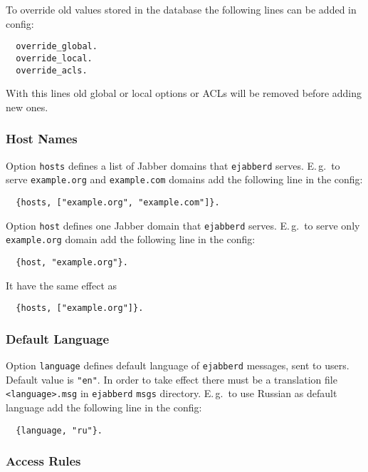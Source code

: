 \documentclass[a4paper,10pt]{article}
\newcommand{\jid}[1]{\texttt{#1}}
\newcommand{\option}[1]{\texttt{#1}}
\newcommand{\term}[1]{\texttt{#1}}
\newcommand{\ejabberd}{\texttt{ejabberd}}
\newcommand{\Jabber}{Jabber}
\begin{document}
To override old values stored in the database the following lines can be added
in config:
\begin{verbatim}
  override_global.
  override_local.
  override_acls.
\end{verbatim}
With this lines old global or local options or ACLs will be removed before
adding new ones.


\subsubsection{Host Names}
\label{sec:confighostname}

Option \option{hosts} defines a list of \Jabber{} domains that \ejabberd{}
serves.  E.\,g.\ to serve \jid{example.org} and \jid{example.com} domains add
the following line in the config:
\begin{verbatim}
  {hosts, ["example.org", "example.com"]}.
\end{verbatim}

Option \option{host} defines one \Jabber{} domain that \ejabberd{} serves.
E.\,g.\ to serve only \jid{example.org} domain add the following line in the
config:
\begin{verbatim}
  {host, "example.org"}.
\end{verbatim}
It have the same effect as
\begin{verbatim}
  {hosts, ["example.org"]}.
\end{verbatim}


\subsubsection{Default Language}
\label{sec:configlanguage}

Option \option{language} defines default language of \ejabberd{} messages, sent
to users. Default value is \term{"en"}. In order to take effect there must be a
translation file \term{<language>.msg} in \ejabberd{} \term{msgs} directory.
E.\,g.\ to use Russian as default language add the following line in the config:
\begin{verbatim}
  {language, "ru"}.
\end{verbatim}


\subsubsection{Access Rules}
\label{sec:configaccess}
\end{document}
